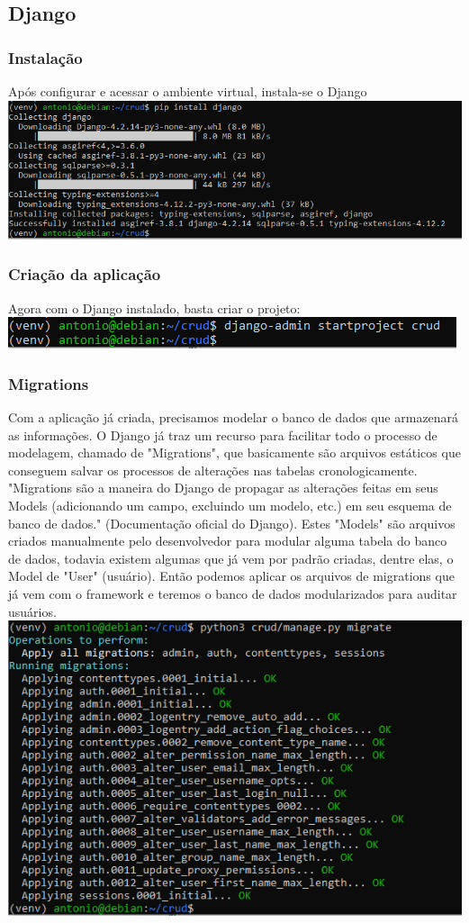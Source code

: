 \documentclass[11pt]{article} %
\begin{document}
\subsection{Django}
\subsubsection{Instalação}
Após configurar e acessar o ambiente virtual, instala-se o Django\\
\includegraphics[width=150mm,scale=1]{images/s4.PNG}
\subsubsection{Criação da aplicação}
Agora com o Django instalado, basta criar o projeto:\\
\includegraphics[]{images/s5.PNG}
\subsubsection{Migrations}
Com a aplicação já criada, precisamos modelar o banco de dados que armazenará as informações. O Django já traz um recurso para facilitar todo o processo de modelagem, chamado de "Migrations", que basicamente são arquivos estáticos que conseguem salvar os processos de alterações nas tabelas cronologicamente. "Migrations são a maneira do Django de propagar as alterações feitas em seus Models (adicionando um campo, excluindo um modelo, etc.) em seu esquema de banco de dados." (Documentação oficial do Django). Estes "Models" são arquivos criados manualmente pelo desenvolvedor para modular alguma tabela do banco de dados, todavia existem algumas que já vem por padrão criadas, dentre elas, o Model de "User" (usuário). Então podemos aplicar os arquivos de migrations que já vem com o framework e teremos o banco de dados modularizados para auditar usuários.\\
\includegraphics[]{images/s6.PNG}
\end{document}
